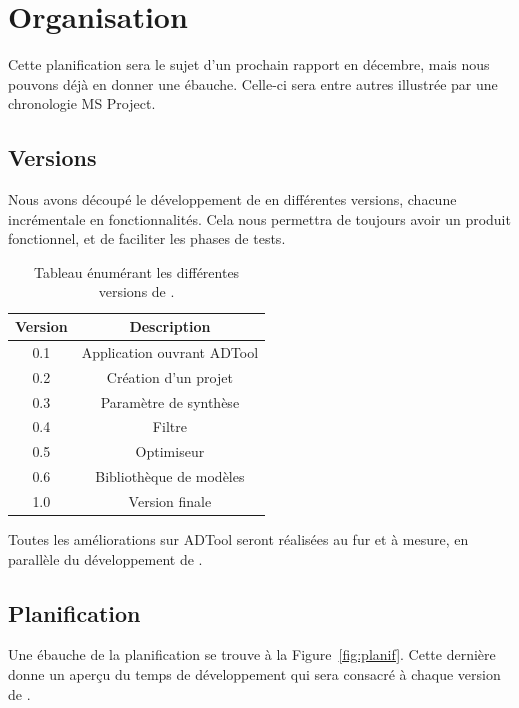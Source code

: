 \section{Organisation}
     Cette planification sera le sujet d'un prochain rapport en décembre, mais nous pouvons déjà en donner une ébauche. Celle-ci sera entre autres illustrée par une chronologie MS Project.

    \subsection{Versions}
        Nous avons découpé le développement de \glasir{} en différentes versions, chacune incrémentale en fonctionnalités. Cela nous permettra de toujours avoir un produit fonctionnel, et de faciliter les phases de tests.

        \begin{table}[h!]
            \centering
            \begin{tabular}{|c|c|}
                \hline
                Version & Description\\
                \hline
                0.1 & Application ouvrant ADTool\\
                \hline
                0.2 & Création d'un projet\\
                \hline
                0.3 & Paramètre de synthèse\\
                \hline
                0.4 & Filtre\\
                \hline
                0.5 & Optimiseur\\
                \hline
                0.6 & Bibliothèque de modèles\\
                \hline
                1.0 & Version finale\\
                \hline
            \end{tabular}
            \caption{Tableau énumérant les différentes versions de \glasir{}.}
        \end{table} 

        Toutes les améliorations sur ADTool seront réalisées au fur et à mesure, en parallèle du développement de \glasir{}.

    \subsection{Planification}
        Une ébauche de la planification se trouve à la {\sc Figure}~\ref{fig:planif}. Cette dernière donne un aperçu du temps de développement qui sera consacré à chaque version de \glasir{}. 


